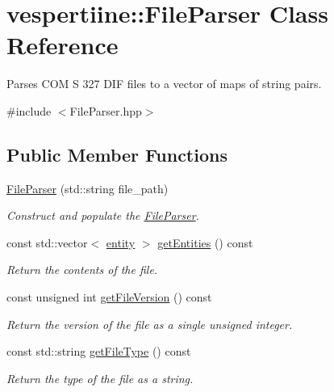 \hypertarget{classvespertiine_1_1FileParser}{}\section{vespertiine\+:\+:File\+Parser Class Reference}
\label{classvespertiine_1_1FileParser}


Parses C\+OM S 327 D\+IF files to a vector of maps of string pairs.  




{\ttfamily \#include $<$File\+Parser.\+hpp$>$}

\subsection*{Public Member Functions}
\begin{DoxyCompactItemize}
\item 
\hyperlink{group__vespertiine_ga01e372573c11d4c2848419c8842d583e}{File\+Parser} (std\+::string file\+\_\+path)
\begin{DoxyCompactList}\small\item\em Construct and populate the \hyperlink{classvespertiine_1_1FileParser}{File\+Parser}. \end{DoxyCompactList}\item 
const std\+::vector$<$ \hyperlink{group__vespertiine_gaf9205d715bdeade18d7039864ef59b44}{entity} $>$ \hyperlink{group__vespertiine_gac2360eb7febe37b75f13dc697a3d37ed}{get\+Entities} () const 
\begin{DoxyCompactList}\small\item\em Return the contents of the file. \end{DoxyCompactList}\item 
const unsigned int \hyperlink{group__vespertiine_ga69070e93ff23a24380d0bad1c096205a}{get\+File\+Version} () const 
\begin{DoxyCompactList}\small\item\em Return the version of the file as a single unsigned integer. \end{DoxyCompactList}\item 
const std\+::string \hyperlink{group__vespertiine_ga950b19f6ead99d8297e37eaeeed2fd3f}{get\+File\+Type} () const 
\begin{DoxyCompactList}\small\item\em Return the type of the file as a string. \end{DoxyCompactList}\end{DoxyCompactItemize}
